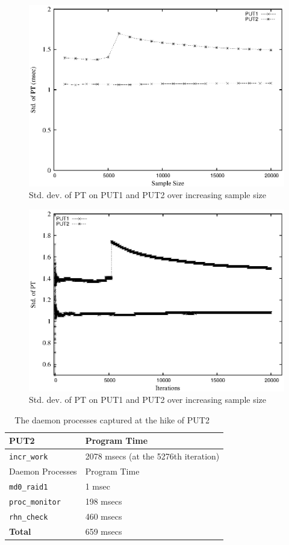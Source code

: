 \documentclass[10pt]{article}
\begin{document}
 \newpage
 
\begin{figure}[hp!]
	\centering
	\includegraphics[scale=0.8]{put_pt_std.eps}
	\caption{Std. dev. of PT on PUT1 and PUT2 over increasing sample size ~\label{fig:std_ss}}
\end{figure}

\begin{figure}[hp!]
	\centering
	\includegraphics[scale=0.8]{put_pt_20k_std.eps}
	\caption{Std. dev. of PT on PUT1 and PUT2 over increasing sample size ~\label{fig:detailed_std_ss}}
\end{figure}

\begin{table}
\centering
{
 \begin{tabular}{|l|l|} \hline
PUT2  & Program Time \\ \hline
{\tt incr\_work} & 2078 msecs (at the 5276th iteration)\\ \hline \hline
Daemon Processes  & Program Time \\ \hline
{\tt md0\_raid1} & 1 msec\\ \hline
{\tt proc\_monitor} & 198 msecs\\ \hline
{\tt rhn\_check} & 460 msecs\\ \hline \hline
{\bf Total} & 659 msecs\\ \hline
  \end{tabular}
  }
 \caption{The daemon processes captured at the hike of PUT2~\label{fig:daemon}}
\end{table}
\end{document}
